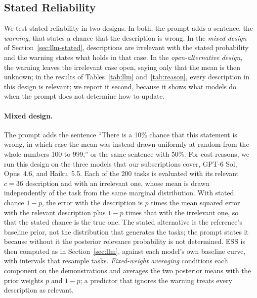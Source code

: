 \documentclass{article}
\theoremstyle{definition}
\begin{document}
\subsection{Stated Reliability}\label{app:llm-reliability}

We test stated reliability in two designs. In both, the prompt adds a sentence, the \emph{warning}, that states a chance that the description is wrong. In the \emph{mixed design} of Section~\ref{sec:llm-stated}, descriptions are irrelevant with the stated probability and the warning states what holds in that case. In the \emph{open-alternative design}, the warning leaves the irrelevant case open, saying only that the mean is then unknown; in the results of Tables~\ref{tab:llm} and~\ref{tab:reason}, every description in this design is relevant; we report it second, because it shows what models do when the prompt does not determine how to update.

\paragraph{Mixed design.}
The prompt adds the sentence ``There is a 10\% chance that this statement is wrong, in which case the mean was instead drawn uniformly at random from the whole numbers 100 to 999,'' or the same sentence with 50\%. For cost reasons, we run this design on the three models that our subscriptions cover, GPT-6 Sol, Opus~4.6, and Haiku~5.5. Each of the $200$ tasks is evaluated with its relevant $c=36$ description and with an irrelevant one, whose mean is drawn independently of the task from the same marginal distribution. With stated chance $1-p$, the error with the description is $p$ times the mean squared error with the relevant description plus $1-p$ times that with the irrelevant one, so that the stated chance is the true one. The stated alternative is the reference's baseline prior, not the distribution that generates the tasks; the prompt states it because without it the posterior relevance probability is not determined. ESS is then computed as in Section~\ref{sec:llm}, against each model's own baseline curve, with intervals that resample tasks. \emph{Fixed-weight averaging} conditions each component on the demonstrations and averages the two posterior means with the prior weights $p$ and $1-p$; a predictor that ignores the warning treats every description as relevant.
\end{document}
